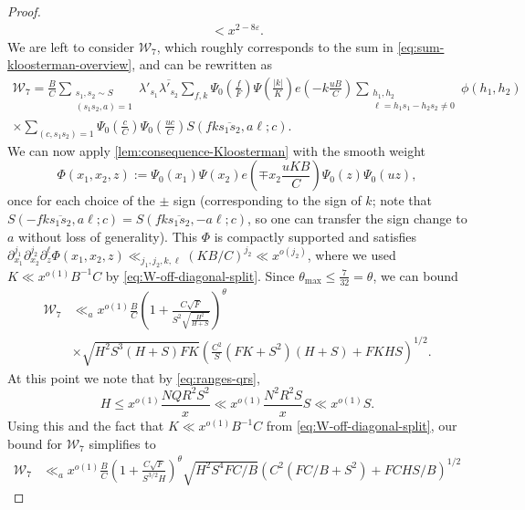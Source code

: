 \documentclass[reqno,11pt]{amsart}
\theoremstyle{remark}
\numberwithin{equation}{section}
\newcommand{\msW}{\mathscr{W}}
\newcommand{\eps}{\varepsilon}
\renewcommand{\bar}{\overline}
\begin{document}
\begin{proof}
\[\begin{aligned}
    <
    x^{2-8\eps}.
\end{aligned}
\]
We are left to consider $\msW_7$, which roughly corresponds to the sum in \cref{eq:sum-kloosterman-overview}, and can be rewritten as
\[
\begin{aligned}
    \msW_7 = \frac{B}{C} \sum_{\substack{s_1, s_2 \sim S \\ (s_1 s_2, a) = 1}} \lambda'_{s_1} \bar{\lambda'_{s_2}}
    \sum_{f,k} \Psi_0\left(\frac{f}{F}\right)
    \Psi\left(\frac{|k|}{K}\right) e\left(-k\frac{uB}{C}\right)
    \sum_{\substack{h_1, h_2 \\ \ell = h_1 s_1 - h_2 s_2 \neq 0}} \phi(h_1, h_2)
    \\
    \times 
    \sum_{(c, s_1s_2) = 1}
    \Psi_0\left(\frac{c}{C}\right) \Psi_0\left(\frac{uc}{C}\right)
    S(fk\bar{s_1 s_2}, a\ell; c).
\end{aligned}
\]
We can now apply \cref{lem:consequence-Kloosterman} with the smooth weight
\[
    \Phi\left(x_1, x_2, z\right) := \Psi_0\left(x_1\right)
    \Psi\left(x_2\right) e\left(\mp x_2\frac{uKB}{C}\right)  \Psi_0\left(z\right) \Psi_0\left(uz\right),
\]
once for each choice of the $\pm$ sign (corresponding to the sign of $k$; note that $S(-fk\bar{s_1 s_2}, a\ell; c) = S(fk\bar{s_1 s_2}, -a\ell; c)$, so one can transfer the sign change to $a$ without loss of generality). This $\Phi$ is compactly supported and satisfies $\partial_{x_1}^{j_1} \partial_{x_2}^{j_2} \partial_z^\ell \Phi(x_1, x_2, z) \ll_{j_1,j_2,k,\ell} (KB/C)^{j_2} \ll x^{o(j_2)}$, where we used $K \ll x^{o(1)} B^{-1} C$ by \cref{eq:W-off-diagonal-split}. Since $\theta_{\max} \le \tfrac{7}{32} = \theta$, we can bound
\[
\begin{aligned}
    \msW_7 &\ll_a x^{o(1)} \frac{B}{C} 
    \left(1 + \frac{C\sqrt{F}}{S^2\sqrt{\frac{H^2}{H+S}}}\right)^{\theta} 
    \\
    &\times
    \sqrt{H^2S^3 (H + S) F K}
    \left(\frac{C^2}{S}\left(FK + S^2\right)\left(H + S\right) + FKHS\right)^{1/2}.
\end{aligned}
\]
At this point we note that by \cref{eq:ranges-qrs},
\[
    H \le x^{o(1)} \frac{NQ R^2 S^2}{x} 
    \ll 
    x^{o(1)}
    \frac{N^2 R^2 S}{x} S 
    \ll 
    x^{o(1)} S.
\]
Using this and the fact that $K \ll x^{o(1)} B^{-1} C$ from \cref{eq:W-off-diagonal-split}, our bound for $\msW_7$ simplifies to
\[
\begin{aligned}
    \msW_7 &\ll_a x^{o(1)} \frac{B}{C} 
    \left(1 + \frac{C\sqrt{F}}{S^{3/2} H}\right)^{\theta} 
    \sqrt{H^2S^4 F C / B}
    \left(C^2\left(FC/B + S^2\right) + FCHS/B\right)^{1/2}

\end{aligned}\]
\end{proof}
\end{document}
